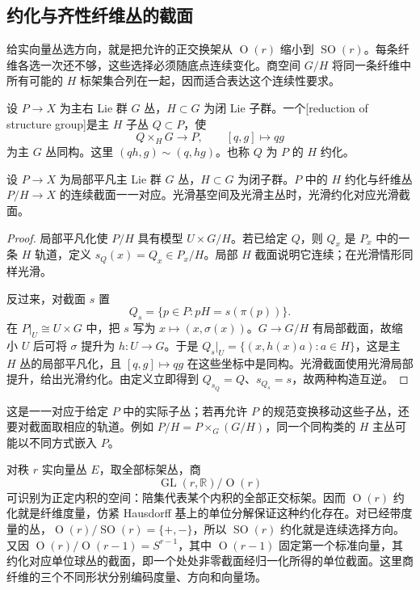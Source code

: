 \subsection{约化与齐性纤维丛的截面}
\label{g2:subsec:1904:02}

给实向量丛选方向，就是把允许的正交换架从 \(\operatorname O(r)\) 缩小到 \(\operatorname{SO}(r)\)。每条纤维各选一次还不够，这些选择必须随底点连续变化。商空间 \(G/H\) 将同一条纤维中所有可能的 \(H\) 标架集合列在一起，因而适合表达这个连续性要求。

\begin{definition}\label{g2:def:structure-group-reduction}
	设 \(P\to X\) 为主右 Lie 群 \(G\) 丛，\(H\subset G\) 为闭 Lie 子群。一个[reduction of structure group]是主 \(H\) 子丛 \(Q\subset P\)，使
	\[
		Q\times_HG\longrightarrow P,\qquad[q,g]\longmapsto qg
	\]
	为主 \(G\) 丛同构。这里 \((qh,g)\sim(q,hg)\)。也称 \(Q\) 为 \(P\) 的 \(H\) 约化。
\end{definition}

\begin{proposition}\label{g2:prop:reduction-section-equivalence}
	设 \(P\to X\) 为局部平凡主 Lie 群 \(G\) 丛，\(H\subset G\) 为闭子群。\(P\) 中的 \(H\) 约化与纤维丛 \(P/H\to X\) 的连续截面一一对应。光滑基空间及光滑主丛时，光滑约化对应光滑截面。
\end{proposition}
\begin{proof}
	局部平凡化使 \(P/H\) 具有模型 \(U\times G/H\)。若已给定 \(Q\)，则 \(Q_x\) 是 \(P_x\) 中的一条 \(H\) 轨道，定义 \(s_Q(x)=Q_x\in P_x/H\)。局部 \(H\) 截面说明它连续；在光滑情形同样光滑。

	反过来，对截面 \(s\) 置
	\[
		Q_s=\{p\in P:pH=s(\pi(p))\}.
	\]
	在 \(P|_U\cong U\times G\) 中，把 \(s\) 写为 \(x\mapsto(x,\sigma(x))\)。\(G\to G/H\) 有局部截面，故缩小 \(U\) 后可将 \(\sigma\) 提升为 \(h:U\to G\)。于是 \(Q_s|_U=\{(x,h(x)a):a\in H\}\)，这是主 \(H\) 丛的局部平凡化，且 \([q,g]\mapsto qg\) 在这些坐标中是同构。光滑截面使用光滑局部提升，给出光滑约化。由定义立即得到 \(Q_{s_Q}=Q\)、\(s_{Q_s}=s\)，故两种构造互逆。
\end{proof}

这是一一对应于给定 \(P\) 中的实际子丛；若再允许 \(P\) 的规范变换移动这些子丛，还要对截面取相应的轨道。例如 \(P/H=P\times_G(G/H)\)，同一个同构类的 \(H\) 主丛可能以不同方式嵌入 \(P\)。

\ProseParagraphBreak

对秩 \(r\) 实向量丛 \(E\)，取全部标架丛，商
\[
	\operatorname{GL}(r,\mathbb R)/\operatorname O(r)
\]
可识别为正定内积的空间：陪集代表某个内积的全部正交标架。因而 \(\operatorname O(r)\) 约化就是纤维度量，仿紧 Hausdorff 基上的单位分解保证这种约化存在。对已经带度量的丛，\(\operatorname O(r)/\operatorname{SO}(r)=\{+,-\}\)，所以 \(\operatorname{SO}(r)\) 约化就是连续选择方向。又因 \(\operatorname O(r)/\operatorname O(r-1)=S^{r-1}\)，其中 \(\operatorname O(r-1)\) 固定第一个标准向量，其约化对应单位球丛的截面，即一个处处非零截面经归一化所得的单位截面。这里商纤维的三个不同形状分别编码度量、方向和向量场。

